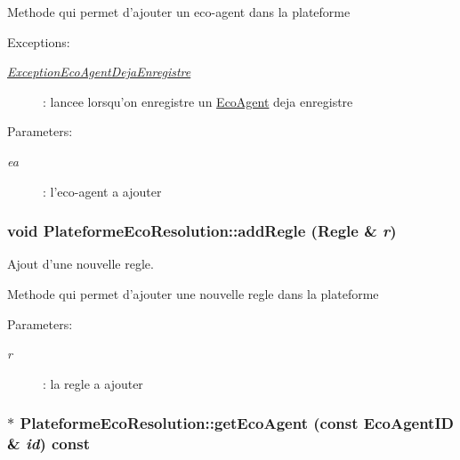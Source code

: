 Methode qui permet d'ajouter un eco-agent dans la plateforme \begin{Desc}
\item[Exceptions:]
\begin{description}
\item[{\em \hyperlink{classExceptionEcoAgentDejaEnregistre}{ExceptionEcoAgentDejaEnregistre}}]: lancee lorsqu'on enregistre un \hyperlink{classEcoAgent}{EcoAgent} deja enregistre \end{description}
\end{Desc}
\begin{Desc}
\item[Parameters:]
\begin{description}
\item[{\em ea}]: l'eco-agent a ajouter \end{description}
\end{Desc}
\hypertarget{classPlateformeEcoResolution_c2978a0e31b186415ca156a19ac8a1dc}{
\subsubsection[{addRegle}]{\setlength{\rightskip}{0pt plus 5cm}void PlateformeEcoResolution::addRegle ({\bf Regle} \& {\em r})}}
\label{classPlateformeEcoResolution_c2978a0e31b186415ca156a19ac8a1dc}


Ajout d'une nouvelle regle. 

Methode qui permet d'ajouter une nouvelle regle dans la plateforme

\begin{Desc}
\item[Parameters:]
\begin{description}
\item[{\em r}]: la regle a ajouter \end{description}
\end{Desc}
\hypertarget{classPlateformeEcoResolution_acd4e2899f178261ddd0fde086932e84}{
\subsubsection[{getEcoAgent}]{ $\ast$ PlateformeEcoResolution::getEcoAgent (const {\bf EcoAgentID} \& {\em id}) const}}
\label{classPlateformeEcoResolution_acd4e2899f178261ddd0fde086932e84}


